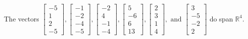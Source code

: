 \begin{exercise}
\begin{exerciseStatement}
  \end{exerciseStatement}
  \begin{exerciseAnswer}
   The vectors \(\left[\begin{array}{r}
-5 \\
1 \\
2 \\
-5
\end{array}\right] , \left[\begin{array}{r}
-1 \\
-2 \\
-4 \\
-5
\end{array}\right] , \left[\begin{array}{r}
-2 \\
4 \\
-1 \\
-4
\end{array}\right] , \left[\begin{array}{r}
5 \\
-6 \\
6 \\
13
\end{array}\right] , \left[\begin{array}{r}
2 \\
3 \\
1 \\
4
\end{array}\right] , \text{ and } \left[\begin{array}{r}
3 \\
-5 \\
-2 \\
2
\end{array}\right]\) 
  	 do  
	span \(\mathbb{R}^4\).
  


  \end{exerciseAnswer}
\end{exercise}